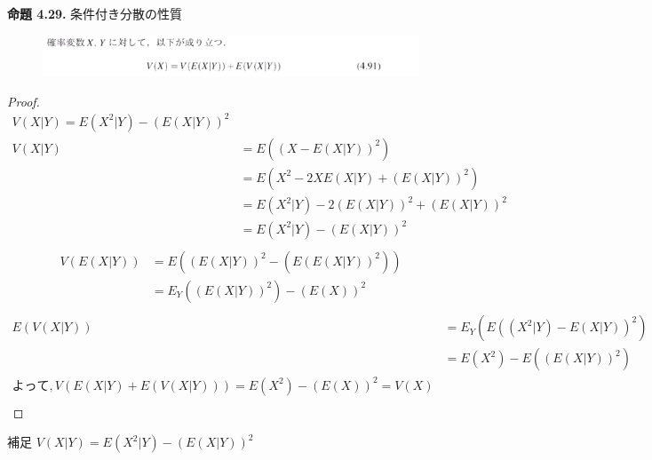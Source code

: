 \documentclass[dvipdfmx,10pt, a4j]{jarticle}
\theoremstyle{definition}
\begin{document}
\noindent
\textbf{命題 4.29.} 条件付き分散の性質\\
\begin{figure}[htbp]
\includegraphics[width=\linewidth]{D_11/meidai/4_29.png}
\end{figure}
\begin{proof}
  \begin{align*}
    V(X|Y) = E(X^2|Y)-(E(X|Y))^2\\
    V(X|Y) &= E((X - E(X|Y))^2)\\
    &= E(X^2 - 2XE(X|Y) + (E(X|Y))^2)\\
    &= E(X^2|Y)-2(E(X|Y))^2 + (E(X|Y))^2\\
    &= E(X^2|Y) - (E(X|Y))^2\\
  \end{align*}
  \begin{align*}
    V(E(X|Y)) &= E((E(X|Y))^2 - (E(E(X|Y))^2))\\
    &= E_Y((E(X|Y))^2)-(E(X))^2\\
  \end{align*}
  \begin{align*}
    E(V(X|Y)) &= E_{Y}(E((X^2|Y)-E(X|Y))^2)\\
    &= E(X^2) - E((E(X|Y))^2)\\
    よって, V(E(X|Y) + E(V(X|Y))) = E(X^2)-(E(X))^2 = V(X)\\
  \end{align*}
\end{proof}
\begin{itembox}[l]{補足}
  $V(X|Y) = E(X^2|Y)-(E(X|Y))^2$\\
\end{itembox}\\
\end{document}
